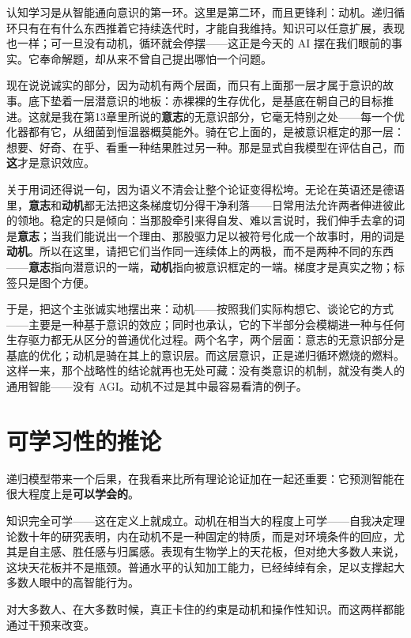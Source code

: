 \documentclass[11pt, twoside, openright]{book}
\begin{document}
认知学习是从智能通向意识的第一环。这里是第二环，而且更锋利：动机。递归循环只有在有什么东西推着它持续迭代时，才能自我维持。知识可以任意扩展，表现也一样；可一旦没有动机，循环就会停摆------这正是今天的 AI 摆在我们眼前的事实。它奉命解题，却从来不曾自己提出哪怕一个问题。

现在说说诚实的部分，因为动机有两个层面，而只有上面那一层才属于意识的故事。底下垫着一层潜意识的地板：赤裸裸的生存优化，是基底在朝自己的目标推进。这就是我在第13章里所说的\textbf{意志}的无意识部分，它毫无特别之处------每一个优化器都有它，从细菌到恒温器概莫能外。骑在它上面的，是被意识框定的那一层：想要、好奇、在乎、看重一种结果胜过另一种。那是显式自我模型在评估自己，而\textbf{这}才是意识效应。

关于用词还得说一句，因为语义不清会让整个论证变得松垮。无论在英语还是德语里，\textbf{意志}和\textbf{动机}都无法把这条梯度切分得干净利落------日常用法允许两者伸进彼此的领地。稳定的只是倾向：当那股牵引来得自发、难以言说时，我们伸手去拿的词是\textbf{意志}；当我们能说出一个理由、那股驱力足以被符号化成一个故事时，用的词是\textbf{动机}。所以在这里，请把它们当作同一连续体上的两极，而不是两种不同的东西------\textbf{意志}指向潜意识的一端，\textbf{动机}指向被意识框定的一端。梯度才是真实之物；标签只是图个方便。

于是，把这个主张诚实地摆出来：动机------按照我们实际构想它、谈论它的方式------主要是一种基于意识的效应；同时也承认，它的下半部分会模糊进一种与任何生存驱力都无从区分的普通优化过程。两个名字，两个层面：意志的无意识部分是基底的优化；动机是骑在其上的意识层。而这层意识，正是递归循环燃烧的燃料。这样一来，那个战略性的结论就再也无处可藏：没有类意识的机制，就没有类人的通用智能------没有 AGI。动机不过是其中最容易看清的例子。

\section*{可学习性的推论}

递归模型带来一个后果，在我看来比所有理论论证加在一起还重要：它预测智能在很大程度上是\textbf{可以学会的}。

知识完全可学------这在定义上就成立。动机在相当大的程度上可学------自我决定理论数十年的研究表明，内在动机不是一种固定的特质，而是对环境条件的回应，尤其是自主感、胜任感与归属感。表现有生物学上的天花板，但对绝大多数人来说，这块天花板并不是瓶颈。普通水平的认知加工能力，已经绰绰有余，足以支撑起大多数人眼中的高智能行为。

对大多数人、在大多数时候，真正卡住的约束是动机和操作性知识。而这两样都能通过干预来改变。
\end{document}
